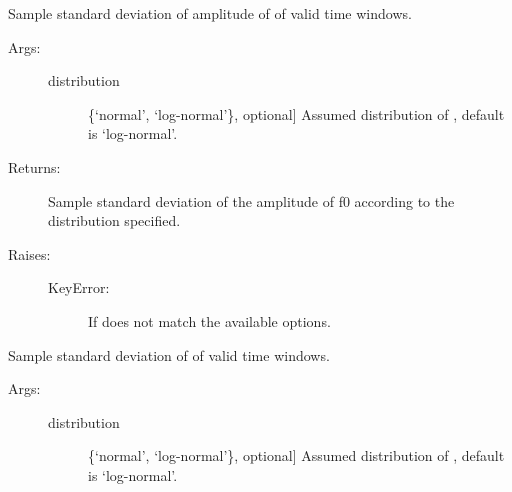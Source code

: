 \documentclass[letterpaper,10pt,english,openany,oneside]{sphinxmanual}
\begin{document}
\begin{fulllineitems}
\begin{fulllineitems}
\end{fulllineitems}


\begin{fulllineitems}
\label{\detokenize{index:hvsrpy.Hvsr.std_f0_amp}}
Sample standard deviation of amplitude of  of valid
time windows.
\begin{description}
\item[{Args:}] \leavevmode\begin{description}
\item[{distribution}] \leavevmode{[}\{‘normal’, ‘log-normal’\}, optional{]}
Assumed distribution of , default is ‘log-normal’.

\end{description}

\item[{Returns:}] \leavevmode
Sample standard deviation of the amplitude of f0 according
to the distribution specified.

\item[{Raises:}] \leavevmode\begin{description}
\item[{KeyError:}] \leavevmode
If  does not match the available options.

\end{description}

\end{description}

\end{fulllineitems}


\begin{fulllineitems}
\label{\detokenize{index:hvsrpy.Hvsr.std_f0_frq}}
Sample standard deviation of  of valid time windows.
\begin{description}
\item[{Args:}] \leavevmode\begin{description}
\item[{distribution}] \leavevmode{[}\{‘normal’, ‘log-normal’\}, optional{]}
Assumed distribution of , default is ‘log-normal’.


\end{description}
\end{description}
\end{fulllineitems}
\end{fulllineitems}
\end{document}
